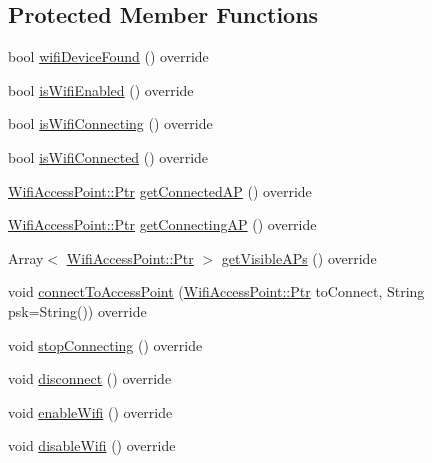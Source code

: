 \subsection*{Protected Member Functions}
\begin{DoxyCompactItemize}
\item 
bool \mbox{\hyperlink{classJsonWifiInterface_ae8f08870a543214555113d103e9fc136}{wifi\+Device\+Found}} () override
\item 
bool \mbox{\hyperlink{classJsonWifiInterface_ab5b5756ab6c456dbf25d93233b237d40}{is\+Wifi\+Enabled}} () override
\item 
bool \mbox{\hyperlink{classJsonWifiInterface_ae39dde05b32eb35e755c79a947210dc4}{is\+Wifi\+Connecting}} () override
\item 
bool \mbox{\hyperlink{classJsonWifiInterface_abd6d4e6e67e47a13560263e96e644131}{is\+Wifi\+Connected}} () override
\item 
\mbox{\hyperlink{classWifiAccessPoint_ad18977f884076774803027efbaa131a0}{Wifi\+Access\+Point\+::\+Ptr}} \mbox{\hyperlink{classJsonWifiInterface_a9c42aee1d88451e199646732f60e125a}{get\+Connected\+AP}} () override
\item 
\mbox{\hyperlink{classWifiAccessPoint_ad18977f884076774803027efbaa131a0}{Wifi\+Access\+Point\+::\+Ptr}} \mbox{\hyperlink{classJsonWifiInterface_a16cf46edd6f175f1217f6b341651b18d}{get\+Connecting\+AP}} () override
\item 
Array$<$ \mbox{\hyperlink{classWifiAccessPoint_ad18977f884076774803027efbaa131a0}{Wifi\+Access\+Point\+::\+Ptr}} $>$ \mbox{\hyperlink{classJsonWifiInterface_aaf538e8120fad2c6a861de5ef9c01543}{get\+Visible\+A\+Ps}} () override
\item 
void \mbox{\hyperlink{classJsonWifiInterface_aed57685bddc0a447976d86095d232cf5}{connect\+To\+Access\+Point}} (\mbox{\hyperlink{classWifiAccessPoint_ad18977f884076774803027efbaa131a0}{Wifi\+Access\+Point\+::\+Ptr}} to\+Connect, String psk=String()) override
\item 
void \mbox{\hyperlink{classJsonWifiInterface_abb186f1293c4f5b7c28dfb2b86f8c95a}{stop\+Connecting}} () override
\item 
void \mbox{\hyperlink{classJsonWifiInterface_a4e9f35812633e8b2b50463f9523585e0}{disconnect}} () override
\item 
void \mbox{\hyperlink{classJsonWifiInterface_ac87e53c922fb19cf684d94d174aa6274}{enable\+Wifi}} () override
\item 
void \mbox{\hyperlink{classJsonWifiInterface_a076d1c4d0830aad955a77c4ff46a15f7}{disable\+Wifi}} () override
\end{DoxyCompactItemize}
